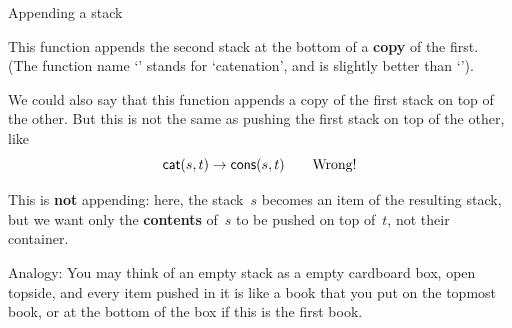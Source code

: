 %
\begin{frame}{Appending a stack}

  This function appends the second stack at the bottom of a
  \textbf{copy} of the first. (The function name `' stands
  for `catenation', and is slightly better than `').

  \bigskip

  We could also say that this function appends a copy of the first
  stack on top of the other. But this is not the same as pushing the
  first stack on top of the other, like
  \begin{equation*}
    \textsf{cat}(s,t) \rightarrow \textsf{cons}(s,t) \qquad
    \text{Wrong!}
  \end{equation*}

  This is \textbf{not} appending: here, the stack~\(s\) becomes an
  item of the resulting stack, but we want only the \textbf{contents}
  of~\(s\) to be pushed on top of~\(t\), not their container.

  \bigskip

  Analogy: You may think of an empty stack as a empty cardboard box,
  open topside, and every item pushed in it is like a book that you
  put on the topmost book, or at the bottom of the box if this is the
  first book.

\end{frame}

